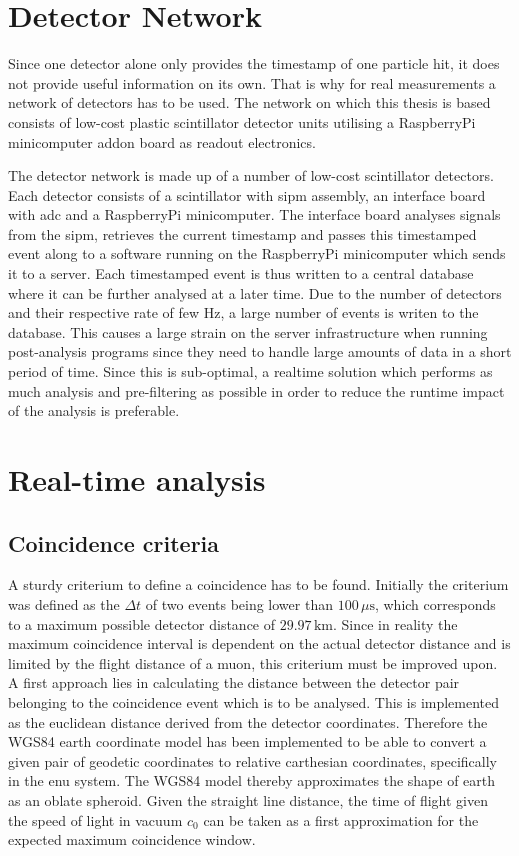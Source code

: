 \documentclass[abstract,toc,los,english,10pt,glossary,acronyms]{jluthesis}
\begin{document}
\section{Detector Network}
Since one detector alone only provides the timestamp of one particle hit, it does not provide useful information on its own. That is why for real measurements a network of detectors has to be used. The network on which this thesis is based consists of low-cost plastic scintillator detector units utilising a RaspberryPi minicomputer addon board as readout electronics.


The detector network is made up of a number of low-cost scintillator detectors. Each detector consists of a scintillator with \acrfull{sipm} assembly, an interface board with \acrfull{adc} and a RaspberryPi minicomputer. The interface board analyses signals from the \acrshort{sipm}, retrieves the current timestamp and passes this timestamped event along to a software running on the RaspberryPi minicomputer which sends it to a server. Each timestamped event is thus written to a central database where it can be further analysed at a later time. Due to the number of detectors and their respective rate of few Hz, a large number of events is writen to the database. This causes a large strain on the server infrastructure when running post-analysis programs since they need to handle large amounts of data in a short period of time. Since this is sub-optimal, a realtime solution which performs as much analysis and pre-filtering as possible in order to reduce the runtime impact of the analysis is preferable.

\section{Real-time analysis}
\subsection{Coincidence criteria}
A sturdy criterium to define a coincidence has to be found. Initially the criterium was defined as the $\Delta{t}$ of two events being lower than $100\,\mu\text{s}$, which corresponds to a maximum possible detector distance of $29.97\,\text{km}$. Since in reality the maximum coincidence interval is dependent on the actual detector distance and is limited by the flight distance of a muon, this criterium must be improved upon. A first approach lies in calculating the distance between the detector pair belonging to the coincidence event which is to be analysed. This is implemented as the euclidean distance derived from the detector coordinates. Therefore the WGS84 earth coordinate model has been implemented to be able to convert a given pair of geodetic coordinates to relative carthesian coordinates, specifically in the \acrfull{enu} system. The WGS84 model thereby approximates the shape of earth as an oblate spheroid. Given the straight line distance, the time of flight given the speed of light in vacuum $c_0$ can be taken as a first approximation for the expected maximum coincidence window.
\end{document}

